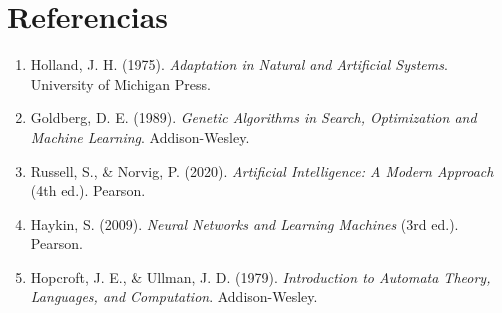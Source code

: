 \documentclass[12pt,a4paper]{article}
\begin{document}
\section*{Referencias}

\begin{enumerate}
  \item Holland, J. H. (1975). \textit{Adaptation in Natural and Artificial Systems}. University of Michigan Press.
  \item Goldberg, D. E. (1989). \textit{Genetic Algorithms in Search, Optimization and Machine Learning}. Addison-Wesley.
  \item Russell, S., \& Norvig, P. (2020). \textit{Artificial Intelligence: A Modern Approach} (4th ed.). Pearson.
  \item Haykin, S. (2009). \textit{Neural Networks and Learning Machines} (3rd ed.). Pearson.
  \item Hopcroft, J. E., \& Ullman, J. D. (1979). \textit{Introduction to Automata Theory, Languages, and Computation}. Addison-Wesley.
\end{enumerate}
\end{document}
